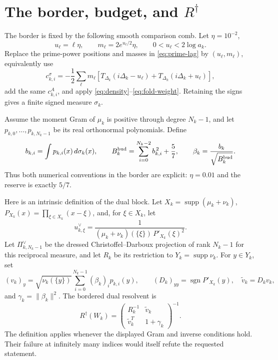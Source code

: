 \documentclass[11pt]{article}
\newcommand{\Rd}{R^{\dagger}}
\begin{document}
\section{The border, budget, and \texorpdfstring{$R^\dagger$}{R-dagger}}

The border is fixed by the following smooth comparison comb.
Let $\eta=10^{-2}$,
\[
 u_\ell=\ell\eta,\qquad
 m_\ell=2e^{u_\ell/2}\eta,\qquad
 0<u_\ell<2\log a_k .
\]
Replace the prime-power positions and masses in
\eqref{eq:prime-lag} by $(u_\ell,m_\ell)$, equivalently use
\[
 c^{\sigma}_{k,i}
 =-\frac12\sum_\ell m_\ell
 \left[T_{\Delta_k}(i\Delta_k-u_\ell)
      +T_{\Delta_k}(i\Delta_k+u_\ell)\right],
\]
add the same $c^A_{k,i}$, and apply
\eqref{eq:density}--\eqref{eq:fold-weight}.  Retaining the signs
gives a finite signed measure $\sigma_k$.

Assume the moment Gram of $\mu_k$ is positive through degree
$N_k-1$, and let $p_{k,0},\ldots,p_{k,N_k-1}$ be its real
orthonormal polynomials.  Define
\begin{equation}\label{eq:border-budget}
 b_{k,i}=\int p_{k,i}(x)\,d\sigma_k(x),\qquad
 B_k^{\rm bud}=\sum_{i=0}^{N_k-2}b_{k,i}^{\,2}+\frac57,\qquad
 \beta_k=\frac{b_k}{\sqrt{B_k^{\rm bud}}}.
\end{equation}
Thus both numerical conventions in the border are explicit:
$\eta=0.01$ and the reserve is exactly $5/7$.

Here is an intrinsic definition of the dual block.  Let
$X_k=\operatorname{supp}(\mu_k+\nu_k)$,
$P_{X_k}(x)=\prod_{\xi\in X_k}(x-\xi)$, and, for
$\xi\in X_k$, let
\[
 u^\vee_{k,\xi}
 =\frac{1}{(\mu_k+\nu_k)(\{\xi\})\,P'_{X_k}(\xi)^2}.
\]
Let $\Pi^\vee_{k,N_k-1}$ be the dressed Christoffel--Darboux
projection of rank $N_k-1$ for this reciprocal measure, and let
$R_k$ be its restriction to $Y_k=\operatorname{supp}\nu_k$.
For $y\in Y_k$, set
\[
 (v_k)_y=\sqrt{\nu_k(\{y\})}
 \sum_{i=0}^{N_k-1}(\beta_k)_i p_{k,i}(y),\qquad
 (D_k)_{yy}=\operatorname{sgn}P'_{X_k}(y),
 \quad\widetilde v_k=D_kv_k,
\]
and $\gamma_k=\|\beta_k\|^2$.  The bordered dual resolvent is
\begin{equation}\label{eq:rdagger}
 \boxed{\displaystyle
 \Rd(W_k)=
 \begin{pmatrix}
 R_k^{-1}&\widetilde v_k\\
 \widetilde v_k^T&1+\gamma_k
 \end{pmatrix}^{-1}.}
\end{equation}
The definition applies whenever the displayed Gram and inverse
conditions hold.  Their failure at infinitely many indices would
itself refute the requested statement.
\end{document}
